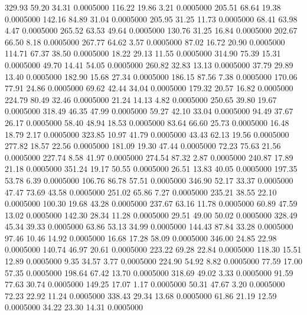  329.93   59.20   34.31   0.0005000
 116.22   19.86    3.21   0.0005000
 205.51   68.64   19.38   0.0005000
 142.16   84.89   31.04   0.0005000
 205.95   31.25   11.73   0.0005000
  68.41   63.98    4.47   0.0005000
 265.52   63.53   49.64   0.0005000
 130.76   31.25   16.84   0.0005000
 202.67   66.50    8.18   0.0005000
 267.77   64.62    3.57   0.0005000
  87.02   16.72   20.90   0.0005000
 114.71   67.37   38.50   0.0005000
  18.22   29.13   11.55   0.0005000
 314.90   75.39   15.31   0.0005000
  49.70   14.41   54.05   0.0005000
 260.82   32.83   13.13   0.0005000
  37.79   29.89   13.40   0.0005000
 182.90   15.68   27.34   0.0005000
 186.15   87.56    7.38   0.0005000
 170.06   77.91   24.86   0.0005000
  69.62   42.44   34.04   0.0005000
 179.32   20.57   16.82   0.0005000
 224.79   80.49   32.46   0.0005000
  21.24   14.13    4.82   0.0005000
 250.65   39.80   19.67   0.0005000
 318.49   46.35   47.99   0.0005000
  59.27   42.10   33.04   0.0005000
  94.49   37.67   26.17   0.0005000
  58.40   48.94   18.53   0.0005000
  83.64   66.60   25.73   0.0005000
  16.48   18.79    2.17   0.0005000
 323.85   10.97   41.79   0.0005000
  43.43   62.13   19.56   0.0005000
 277.82   18.57   22.56   0.0005000
 181.09   19.30   47.44   0.0005000
  72.23   75.63   21.56   0.0005000
 227.74    8.58   41.97   0.0005000
 274.54   87.32    2.87   0.0005000
 240.87   17.89   21.18   0.0005000
 351.24   19.17   50.55   0.0005000
  26.51   13.83   40.05   0.0005000
 197.35   53.78    6.39   0.0005000
 106.76   86.78   57.51   0.0005000
 346.90   52.17   33.37   0.0005000
  47.47   73.69   43.58   0.0005000
 251.02   65.86    7.27   0.0005000
 235.21   38.55   22.10   0.0005000
 100.30   19.68   43.28   0.0005000
 237.67   63.16   11.78   0.0005000
  60.89   47.59   13.02   0.0005000
 142.30   28.34   11.28   0.0005000
  29.51   49.00   50.02   0.0005000
 328.49   45.34   39.33   0.0005000
  63.86   53.13   34.99   0.0005000
 144.43   87.84   33.28   0.0005000
  97.46   10.46   14.92   0.0005000
  16.68   17.28   58.09   0.0005000
 346.00   24.85   22.98   0.0005000
 140.74   46.97   20.61   0.0005000
 223.22   69.28   22.84   0.0005000
 118.30   15.51   12.89   0.0005000
   9.35   34.57    3.77   0.0005000
 224.90   54.92    8.82   0.0005000
  77.59   17.00   57.35   0.0005000
 198.64   67.42   13.70   0.0005000
 318.69   49.02    3.33   0.0005000
  91.59   77.63   30.74   0.0005000
 149.25   17.07    1.17   0.0005000
  50.31   47.67    3.20   0.0005000
  72.23   22.92   11.24   0.0005000
 338.43   29.34   13.68   0.0005000
  61.86   21.19   12.59   0.0005000
  34.22   23.30   14.31   0.0005000
